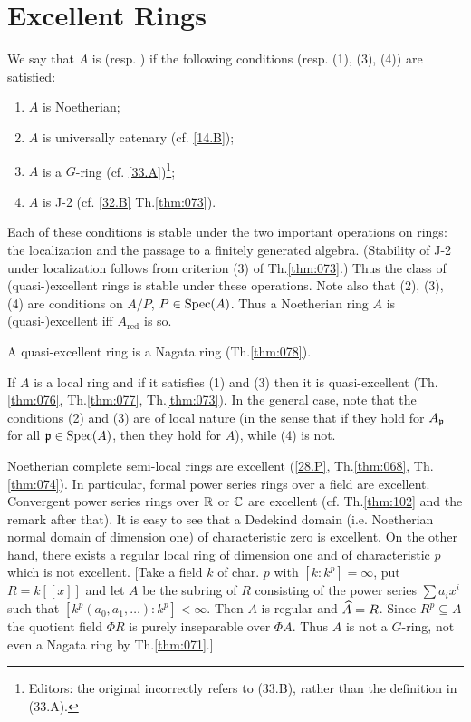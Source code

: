\documentclass[../main]{subfiles}
\begin{document}
\section{Excellent Rings}\label{sec:34}

\begin{pardefinition}
We say that $A$ is  (resp. ) if the following conditions (resp. (1), (3), (4)) are satisfied:

\begin{enumerate}[label = (\arabic*)]
    \item $A$ is Noetherian;
    \item $A$ is universally catenary (cf. \ref{14.B});
    \item $A$ is a $G$-ring (cf. \ref{33.A})\footnote{Editors: the original incorrectly refers to (33.B), rather than the definition in (33.A).};
    \item $A$ is J-2 (cf. \ref{32.B} Th.\ref{thm:073}).
\end{enumerate}
\end{pardefinition}

Each of these conditions is stable under the two important operations on rings: the localization and the passage to a finitely generated algebra. (Stability of J-2 under localization follows from criterion (3) of Th.\ref{thm:073}.) Thus the class of (quasi-)excellent rings is stable under these operations. Note also that (2), (3), (4) are conditions on $A/P$, $P \in \operatorname{Spec}(A)$. Thus a Noetherian ring $A$ is (quasi-)excellent iff $A_{\text{red}}$ is so. 

A quasi-excellent ring is a Nagata ring (Th.\ref{thm:078}).

If $A$ is a local ring and if it satisfies (1) and (3) then it is quasi-excellent (Th.\ref{thm:076}, Th.\ref{thm:077}, Th.\ref{thm:073}). In the general case, note that the conditions (2) and (3) are of local nature (in the sense that if they hold for $A_{\mathfrak{p}}$ for all $\mathfrak{p} \in \operatorname{Spec}(A)$, then they hold for $A$), while (4) is not.

\newparagraph Noetherian complete semi-local rings are excellent (\ref{28.P}, Th.\ref{thm:068}, Th.\ref{thm:074}). In particular, formal power series rings over a field are excellent. Convergent power series rings over $\mathbb{R}$ or $\mathbb{C}$ are excellent (cf. Th.\ref{thm:102} and the remark after that). It is easy to see that a Dedekind domain (i.e. Noetherian normal domain of dimension one) of characteristic zero is excellent. On the other hand, there exists a regular local ring of dimension one and of characteristic $p$ which is not excellent. [Take a field $k$ of char. $p$ with $[k : k^p] = \infty$, put $R = k[[x]]$ and let $A$ be the subring of $R$ consisting of the power series $\sum a_i x^i$ such that $[k^p(a_0, a_1, \ldots) : k^p] < \infty$. Then $A$ is regular and $\widehat{A} = R$. Since $R^p \subseteq A$ the quotient field $\Phi R$ is purely inseparable over $\Phi A$. Thus $A$ is not a $G$-ring, not even a Nagata ring by Th.\ref{thm:071}.]
\end{document}
